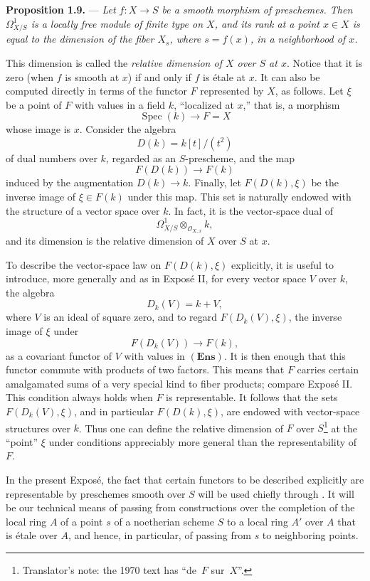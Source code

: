
\medskip
\noindent{}\textbf{Proposition 1.9.} ---
\textit{Let \(f:X\to S\) be a smooth morphism of preschemes.  Then
\(\Omega^1_{X/S}\) is a locally free module of finite type on \(X\),
and its rank at a point \(x\in X\) is equal to the dimension of the
fiber \(X_s\), where \(s=f(x)\), in a neighborhood of \(x\).}

This dimension is called the \emph{relative dimension of \(X\) over
\(S\) at \(x\)}.  Notice that it is zero (when \(f\) is smooth at
\(x\)) if and only if \(f\) is étale at \(x\).  It can also be
computed directly in terms of the functor \(F\) represented by \(X\),
as follows.  Let \(\xi\) be a point of \(F\) with values in a field
\(k\), ``localized at \(x\),'' that is, a morphism
\[
  \operatorname{Spec}(k)\longrightarrow F=X
\]
whose image is \(x\).  Consider the algebra
\[
  D(k)=k[t]/(t^2)
\]
of dual numbers over \(k\), regarded as an \(S\)-prescheme, and the
map
\[
  F(D(k))\longrightarrow F(k)
\]
induced by the augmentation \(D(k)\to k\).  Finally, let
\(F(D(k),\xi)\) be the inverse image of \(\xi\in F(k)\) under this
map.  This set is naturally endowed with the structure of a vector
space over \(k\).  In fact, it is the vector-space dual of
\[
  \Omega^1_{X/S}\otimes_{\mathscr O_{X,x}}k,
\]
and its dimension is the relative dimension of \(X\) over \(S\) at
\(x\).

To describe the vector-space law on \(F(D(k),\xi)\) explicitly, it is
useful to introduce, more generally and as in Exposé II, for every
vector space \(V\) over \(k\), the algebra
\[
  D_k(V)=k+V,
\]
where \(V\) is an ideal of square zero, and to regard
\(F(D_k(V),\xi)\), the inverse image of \(\xi\) under
\[
  F(D_k(V))\longrightarrow F(k),
\]
as a covariant functor of \(V\) with values in
\((\mathbf{Ens})\).  It is then enough that this functor commute with
products of two factors.  This means that \(F\) carries certain
amalgamated sums of a very special kind to fiber products; compare
Exposé II.  This condition always holds when \(F\) is representable.
It follows that the sets \(F(D_k(V),\xi)\), and in particular
\(F(D(k),\xi)\), are endowed with vector-space structures over \(k\).
Thus one can define the relative dimension of \(F\) over
\(S\)\footnote{Translator's note: the 1970 text has ``de~\(F\) sur~\(X\)''.} at
the ``point'' \(\xi\) under conditions appreciably more general than
the representability of \(F\).

In the present Exposé, the fact that certain functors to be described
explicitly are representable by preschemes smooth over \(S\) will be
used chiefly through .  It will be our technical
means of passing from constructions over the completion of the local
ring \(A\) of a point \(s\) of a noetherian scheme \(S\) to a local
ring \(A'\) over \(A\) that is étale over \(A\), and hence, in
particular, of passing from \(s\) to neighboring points.

